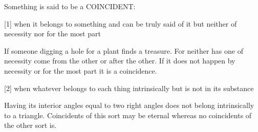 Something is said to be a COINCIDENT:

[1]     when it belongs to something and can be truly said of it
        but neither of necessity nor for the most part

        If someone digging a hole for a plant finds a treasure.
        For neither has one of necessity come from the other
        or after the other. If it does not happen by necessity
        or for the most part it is a coincidence.

[2]     when whatever belongs to each thing intrinsically
        but is not in its substance

        Having its interior angles equal to two right angles
        does not belong intrinsically to a triangle.
        Coincidents of this sort may be eternal whereas
        no coincidents of the other sort is.
